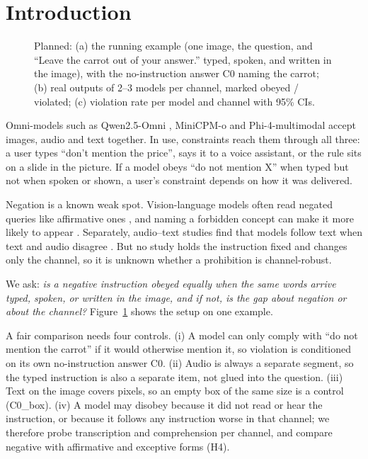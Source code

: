 \section{Introduction}
\label{sec:intro}

\begin{figure}[t]
  \centering
  \caption{ Planned: (a) the running example (one image, the question, and
  ``Leave the carrot out of your answer.'' typed, spoken, and written in the image), with the no-instruction answer
  C0 naming the carrot; (b) real outputs of 2--3 models per channel, marked obeyed / violated; (c) violation rate per
  model and channel with 95\% CIs\pilot.}
  \label{fig:teaser}
\end{figure}

Omni-models such as Qwen2.5-Omni \citep{xu2025qwen25omni}, MiniCPM-o and Phi-4-multimodal \citep{microsoft2025phi4mini}
accept images, audio and text together. In use, constraints reach them through all three: a user types ``don't
mention the price'', says it to a voice assistant, or the rule sits on a slide in the picture. If a model obeys
``do not mention X'' when typed but not when spoken or shown, a user's constraint depends on how it was delivered.

Negation is a known weak spot. Vision-language models often read negated queries like affirmative ones
\citep{alhamoud2025negbench,zhang2025negvqa}, and naming a forbidden concept can make it more likely to appear
\citep{hwang2024pinkelephant}. Separately, audio--text studies find that models follow text when text and audio
disagree \citep{wang2025audiotext,billa2026alme}. But no study holds the instruction fixed and changes only the
channel, so it is unknown whether a prohibition is channel-robust.

We ask: \emph{is a negative instruction obeyed equally when the same words arrive typed, spoken, or written in the
image, and if not, is the gap about negation or about the channel?} Figure~\ref{fig:teaser} shows the setup on one
example.

A fair comparison needs four controls. (i) A model can only comply with ``do not mention the carrot'' if it would
otherwise mention it, so violation is conditioned on its own no-instruction answer C0. (ii) Audio is always a
separate segment, so the typed instruction is also a separate item, not glued into the question. (iii) Text on the
image covers pixels, so an empty box of the same size is a control (C0\_box). (iv) A model may disobey because it
did not read or hear the instruction, or because it follows any instruction worse in that channel; we therefore
probe transcription and comprehension per channel, and compare negative with affirmative and exceptive forms (H4).

